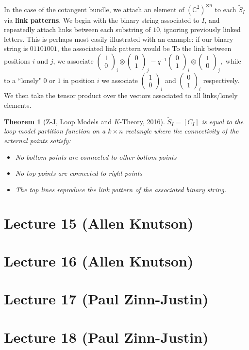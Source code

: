 \documentclass[12pt]{amsart}
\numberwithin{equation}{section}
\newtheorem{Theorem}[equation]{Theorem}
\theoremstyle{definition}
\numberwithin{figure}{section}
\newcommand{\C}{\mathbb{C}}
\newcommand{\Stil}{\tilde{S}}
\begin{document}
In the case of the cotangent bundle, we attach an element of $(\C^2)^{\otimes n}$ to each $\Stil_I$ via \textbf{link patterns}. We begin with the binary string associated to $I$, and repeatedly attach links between each substring of $1 0$, ignoring previously linked letters. This is perhaps most easily illustrated with an example: if our binary string is $01101001$, the associated link pattern would be 
To the link  between positions $i$ and $j$, we associate
$\begin{pmatrix}
	1\\
	0
	\end{pmatrix}_i
	\otimes
\begin{pmatrix}
	0\\
	1
\end{pmatrix}_j
-
q^{-1}
\begin{pmatrix}
	0\\
	1
\end{pmatrix}_i
\otimes
\begin{pmatrix}
	1\\
	0
\end{pmatrix}_j,
$
while to a ``lonely" $0$ or $1$ in position $i$ we associate $\begin{pmatrix} 1\\ 0\end{pmatrix}_i$ and $\begin{pmatrix} 0\\ 1\end{pmatrix}_i$ respectively. We then take the tensor product over the vectors associated to all links/lonely elements. 

\begin{Theorem}[Z-J, \href{https://doi.org/10.3842/SIGMA.2018.069}{Loop Models and $K$-Theory}, 2016]
	$\Stil_I = [C_I]$ is equal to the loop model partition function on a $k \times n$ rectangle where the connectivity of the external points satisfy:
	\begin{itemize}
		\item No bottom points are connected to other bottom points
		\item No top points are connected to right points
		\item The top lines reproduce the link pattern of the associated binary string.
	\end{itemize}
\end{Theorem}

\section{Lecture 15 (Allen Knutson)}

\section{Lecture 16 (Allen Knutson)}

\section{Lecture 17 (Paul Zinn-Justin)}

\section{Lecture 18 (Paul Zinn-Justin)}
\end{document}
